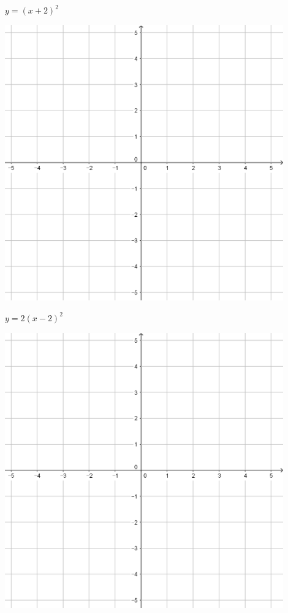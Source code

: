 \documentclass[a4paper]{oblivoir}
\begin{document}
\begin{minipage}{0.45\textwidth}\centering
\(y=(x+2)^2\)
\par\bigskip\includegraphics[width=0.9\textwidth]{55}
\end{minipage}
\begin{minipage}{0.45\textwidth}\centering
\(y=2(x-2)^2\)
\par\bigskip\includegraphics[width=0.9\textwidth]{55}
\end{minipage}\bigskip\bigskip\par
\end{document}
